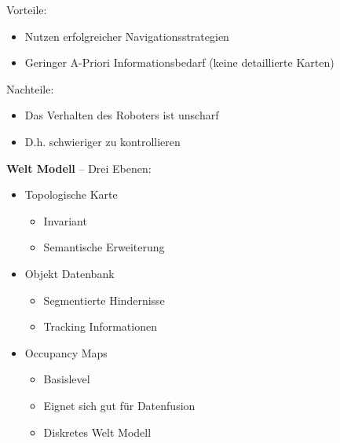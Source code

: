 Vorteile:
\begin{itemize}
	\item Nutzen erfolgreicher Navigationsstrategien
	\item Geringer A-Priori Informationsbedarf (keine detaillierte Karten)
\end{itemize}
Nachteile:
\begin{itemize}
	\item Das Verhalten des Roboters ist unscharf
	\item D.h. schwieriger zu kontrollieren
\end{itemize}
\noindent
\textbf{Welt Modell} -- Drei Ebenen:
\begin{itemize}
	\item Topologische Karte
	\begin{itemize}
		\item Invariant
		\item Semantische Erweiterung
	\end{itemize}
	\item Objekt Datenbank
	\begin{itemize}
		\item Segmentierte Hindernisse
		\item Tracking Informationen
	\end{itemize}
	\item Occupancy Maps
	\begin{itemize}
		\item Basislevel
		\item Eignet sich gut für Datenfusion
		\item Diskretes Welt Modell
	\end{itemize}
\end{itemize}

